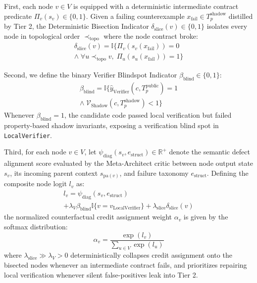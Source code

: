 \documentclass[10pt,twocolumn,letterpaper]{article}
\begin{document}
First, each node $v\in V$ is equipped with a deterministic intermediate contract predicate $\Pi_{v}(s_{v})\in\{0,1\}$. Given a failing counterexample $x_{\text{fail}}\in T_{p}^{\text{shadow}}$ distilled by Tier 2, the Deterministic Bisection Indicator $\delta_{\text{slice}}(v)\in\{0,1\}$ isolates every node in topological order $\prec_{\text{topo}}$ where the node contract broke:
\begin{multline}
\delta_{\text{slice}}(v) = \mathbb{I}\Big\{\Pi_{v}\!\left(s_{v}(x_{\text{fail}})\right)=0 \\
\wedge\; \forall u\prec_{\text{topo}} v,\; \Pi_{u}\!\left(s_{u}(x_{\text{fail}})\right)=1\Big\}
\end{multline}

Second, we define the binary Verifier Blindspot Indicator $\beta_{\text{blind}}\in\{0,1\}$:
\begin{multline}
\beta_{\text{blind}} = \mathbb{I}\Big\{\hat{y}_{\text{Verifier}}(c,T_{p}^{\text{public}})=1 \\
\wedge\; \mathcal{V}_{\text{Shadow}}(c,T_{p}^{\text{shadow}})<1\Big\}
\end{multline}
Whenever $\beta_{\text{blind}}=1$, the candidate code passed local verification but failed property-based shadow invariants, exposing a verification blind spot in \texttt{LocalVerifier}.

Third, for each node $v\in V$, let $\psi_{\text{diag}}(s_{v},e_{\text{struct}})\in\mathbb{R}^{+}$ denote the semantic defect alignment score evaluated by the Meta-Architect critic between node output state $s_{v}$, its incoming parent context $s_{\text{pa}(v)}$, and failure taxonomy $e_{\text{struct}}$. Defining the composite node logit $l_{v}$ as:
\begin{multline}
l_{v} = \psi_{\text{diag}}(s_{v},e_{\text{struct}}) \\
+ \lambda_{V}\beta_{\text{blind}}\mathbb{I}\{v=v_{\text{LocalVerifier}}\} + \lambda_{\text{slice}}\delta_{\text{slice}}(v)
\end{multline}
the normalized counterfactual credit assignment weight $\alpha_{v}$ is given by the softmax distribution:
\begin{equation}
\alpha_{v} = \frac{\exp(l_{v})}{\sum_{u\in V}\exp(l_{u})}
\end{equation}
where $\lambda_{\text{slice}}\gg\lambda_{V}>0$ deterministically collapses credit assignment onto the bisected nodes whenever an intermediate contract fails, and prioritizes repairing local verification whenever silent false-positives leak into Tier 2.
\end{document}
